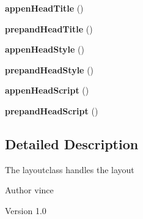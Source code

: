 \begin{DoxyCompactItemize}
\item 
\hypertarget{class_anemo_1_1_layout_a5db26e32be40718936630d2fb4d948bc}{
{\bfseries appenHeadTitle} ()}
\label{class_anemo_1_1_layout_a5db26e32be40718936630d2fb4d948bc}

\item 
\hypertarget{class_anemo_1_1_layout_a8ee4b0fc5d1f194439becb505b70213f}{
{\bfseries prepandHeadTitle} ()}
\label{class_anemo_1_1_layout_a8ee4b0fc5d1f194439becb505b70213f}

\item 
\hypertarget{class_anemo_1_1_layout_a4dbefed20d28ffbb7e076c47c84e7729}{
{\bfseries appenHeadStyle} ()}
\label{class_anemo_1_1_layout_a4dbefed20d28ffbb7e076c47c84e7729}

\item 
\hypertarget{class_anemo_1_1_layout_ac1871802fe496a07ef1b148aadf941a0}{
{\bfseries prepandHeadStyle} ()}
\label{class_anemo_1_1_layout_ac1871802fe496a07ef1b148aadf941a0}

\item 
\hypertarget{class_anemo_1_1_layout_a78ef86472efcba116638254dd27b128e}{
{\bfseries appenHeadScript} ()}
\label{class_anemo_1_1_layout_a78ef86472efcba116638254dd27b128e}

\item 
\hypertarget{class_anemo_1_1_layout_a78bfadd5c437ac62349833761d523260}{
{\bfseries prepandHeadScript} ()}
\label{class_anemo_1_1_layout_a78bfadd5c437ac62349833761d523260}

\end{DoxyCompactItemize}


\subsection{Detailed Description}
The layoutclass handles the layout \begin{DoxyAuthor}{Author}
vince 
\end{DoxyAuthor}
\begin{DoxyVersion}{Version}
1.0 
\end{DoxyVersion}


